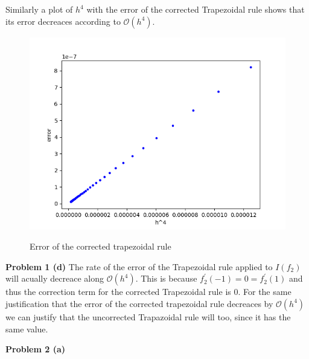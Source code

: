 \documentclass[12pt]{article}
\newcommand{\problem}[1]{\hspace{-4 ex} \large \textbf{Problem #1} }
\begin{document}
	Similarly a plot of $h^4$ with the error of the corrected Trapezoidal rule shows that its error decreaces according to $\mathcal{O}(h^4)$.
	\begin{figure}[H]
		\caption{Error of the corrected trapezoidal rule}
		\includegraphics[width=.75\textwidth]{hw7_p1_fig2}
		\label{p1_T_corrected_err}
		\centering
	\end{figure}

\bigbreak
\problem{1 (d)} The rate of the error of the Trapezoidal rule applied to $I(f_2)$ will acually decreace along $\mathcal{O}(h^4)$. This is because $f_2^\prime(-1)=0= f_2^\prime(1)$ and thus the correction term for the corrected Trapezoidal rule is $0$. For the same justification that the error of the corrected trapezoidal rule decreaces by $\mathcal{O}(h^4)$ we can justify that the uncorrected Trapazoidal rule will too, since it has the same value.

\bigbreak
\problem{2 (a)}
\end{document}

